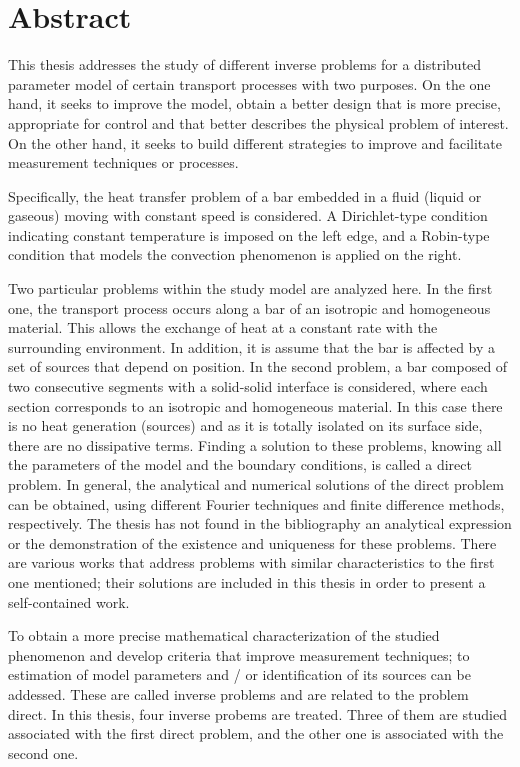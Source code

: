 \chapter*{Abstract}

This thesis addresses the study of different inverse problems for a distributed parameter model of certain transport processes with two purposes. 
On the one hand, it seeks to improve the model, obtain a better design that is more precise, appropriate for control and that better describes the physical problem of interest. On the other hand, it seeks to build different strategies to improve and facilitate measurement techniques or processes.


Specifically, the heat transfer problem of a bar 
embedded in a fluid (liquid or gaseous) moving with constant speed is considered. A Dirichlet-type condition indicating constant temperature is imposed on the left edge, and a Robin-type condition that models the convection phenomenon is applied on the right. 


Two particular problems within the study model are analyzed here. In the first one, the transport process occurs along a bar of an isotropic and homogeneous material. This allows the exchange of heat at a constant rate with the surrounding environment. In addition, it is assume that the bar is affected by a set of sources that depend on position. In the second problem, a bar composed of two consecutive segments with a solid-solid interface is considered, where each section corresponds to an isotropic and homogeneous material.  In this case there is no heat generation (sources) and as it is totally isolated on its surface side, there are no dissipative terms. Finding a solution to these problems, knowing all the parameters of the model and the boundary conditions, is called a direct problem.
In general, the analytical and numerical solutions of the direct problem can be
obtained, using different Fourier techniques and finite difference methods,
respectively. The thesis has not found in the bibliography an analytical expression or the demonstration of the existence and uniqueness for these problems. There are various works that address problems with similar characteristics to the first one mentioned; their solutions are included in this thesis in order to present a self-contained work.

To obtain a more precise mathematical characterization of the studied phenomenon and develop criteria that improve measurement techniques;  to estimation of model parameters and / or identification of its sources can be addessed. These are called inverse problems and are related to the problem
direct. In this thesis, four inverse probems are treated. Three of them are studied associated with the first direct problem, and the other one is associated with the second one.

